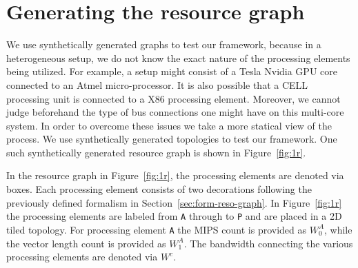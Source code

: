 \section{Generating the resource graph}
\label{sec:gener-reso-graph}


\begin{figure*}[t!]
  \centering
  \scalebox{0.45}{}
  \caption{An example resource graph}
  \label{fig:1r}
\end{figure*}

We use synthetically generated graphs to test our framework, because in
a heterogeneous setup, we do not know the exact nature of the processing
elements being utilized. For example, a setup might consist of a Tesla
Nvidia GPU core connected to an Atmel micro-processor. It is also
possible that a CELL processing unit is connected to a X86 processing
element. Moreover, we cannot judge beforehand the type of bus
connections one might have on this multi-core system. In order to
overcome these issues we take a more statical view of the process. We
use synthetically generated topologies to test our framework. One such
synthetically generated resource graph is shown in Figure~\ref{fig:1r}.

In the resource graph in Figure~\ref{fig:1r}, the processing elements
are denoted via boxes. Each processing element consists of two
decorations following the previously defined formalism in
Section~\ref{sec:form-reso-graph}. In Figure~\ref{fig:1r} the processing
elements are labeled from \texttt{A} through to \texttt{P} and are
placed in a 2D tiled topology. For processing element \texttt{A} the
MIPS count is provided as $W^A_0$, while the vector length count is
provided as $W^A_1$. The bandwidth connecting the various processing
elements are denoted via $W^c$.

